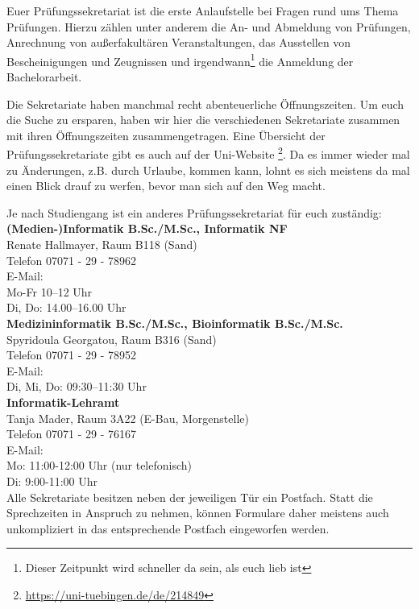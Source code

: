Euer Prüfungssekretariat ist die erste Anlaufstelle bei Fragen rund ums Thema
Prüfungen. Hierzu zählen unter anderem die An- und Abmeldung von Prüfungen,
Anrechnung von außerfakultären Veranstaltungen, das Ausstellen von
Bescheinigungen und Zeugnissen und irgendwann\footnote{Dieser Zeitpunkt wird
schneller da sein, als euch lieb ist} die Anmeldung der Bachelorarbeit.


Die Sekretariate haben manchmal recht abenteuerliche Öffnungszeiten. Um euch
die Suche zu ersparen, haben wir hier die verschiedenen Sekretariate zusammen
mit ihren Öffnungszeiten zusammengetragen. Eine Übersicht der
Prüfungssekretariate gibt es auch auf der Uni-Website
\footnote{\url{https://uni-tuebingen.de/de/214849}}. Da es immer wieder mal zu
Änderungen, z.B. durch Urlaube, kommen kann, lohnt es sich meistens da mal
einen Blick drauf zu werfen, bevor man sich auf den Weg macht.

Je nach Studiengang ist ein anderes Prüfungssekretariat für euch zuständig: \\


\textbf{(Medien-)Informatik B.Sc./M.Sc., Informatik NF}\\
Renate Hallmayer, Raum B118 (Sand)\\
Telefon 07071 - 29 - 78962\\
E-Mail: \\
Mo-Fr 10–12 Uhr\\
Di, Do: 14.00–16.00 Uhr\\

\textbf{Medizininformatik B.Sc./M.Sc., Bioinformatik B.Sc./M.Sc.}\\ 
Spyridoula Georgatou, Raum B316 (Sand)\\
Telefon 07071 - 29 - 78952\\
E-Mail: \\
Di, Mi, Do: 09:30–11:30 Uhr\\

\textbf{Informatik-Lehramt}\\
Tanja Mader, Raum 3A22 (E-Bau, Morgenstelle)\\
Telefon 07071 - 29 - 76167\\
E-Mail: \\
Mo: 11:00-12:00 Uhr (nur telefonisch)\\
Di: 9:00-11:00 Uhr\\

Alle Sekretariate besitzen neben der jeweiligen Tür ein Postfach. Statt die
Sprechzeiten in Anspruch zu nehmen, können Formulare daher meistens auch
unkompliziert in das entsprechende Postfach eingeworfen werden.\\

